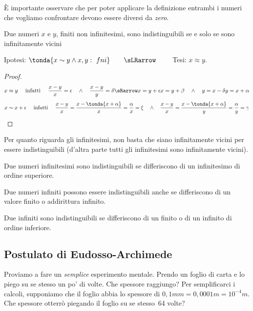 \begin{osservazione}
 È importante osservare che per poter applicare la definizione entrambi i 
numeri che vogliamo confrontare devono essere diversi da \emph{zero}.
\end{osservazione}

\begin{teorema}
Due numeri $x$ e $y$, finiti non infinitesimi, sono indistinguibili se e solo 
se 
sono infinitamente vicini
\end{teorema}
\begin{center}
Ipotesi: $\tonda{x \sim y \wedge x,y:\ fni}\qquad \sLRarrow\qquad$ Tesi: 
$x\approx y$.
\end{center}

\begin{proof}
\[x \approx y \quad \text{ infatti } \quad
\frac{x-y}{x} = \epsilon \quad \wedge \quad 
\frac{x-y}{y} = \delta \sRarrow x=y+\epsilon x=y+\beta \quad \wedge \quad 
y=x-\delta y=x+\alpha
\]
\[x \sim x+\epsilon \quad \text{ infatti } \quad
\frac{x-y}{x}=\frac{x-\tonda{x+\alpha}}{x} = \frac{\alpha}{x}= \xi \quad 
\wedge \quad 
\frac{x-y}{x}=\frac{x-\tonda{x+\alpha}}{y} = \frac{\alpha}{y}= \gamma
\]
\end{proof}

Per quanto riguarda gli infinitesimi, non basta che siano infinitamente 
vicini 
per essere indistinguibili (d'altra parte tutti gli infinitesimi sono 
infinitamente vicini).

\begin{teorema}
Due numeri infinitesimi sono indistinguibili se differiscono di un 
infinitesimo di ordine superiore.
\end{teorema}

Due numeri infiniti possono essere indistinguibili anche se differiscono di 
un 
valore finito o addirittura infinito. 

\begin{teorema}
Due infiniti sono indistinguibili se 
differiscono di un finito o di un infinito di ordine inferiore.
\end{teorema}


\subsection{Postulato di Eudosso-Archimede}
\label{subsec:insnum_eudossoarchimede}

Proviamo a fare un \emph{semplice} esperimento mentale. Prendo un foglio di 
carta e lo piego su se stesso un po' di volte. Che spessore raggiungo?
Per semplificarci i calcoli, supponiamo che il foglio abbia lo spessore 
di $0,1mm = 0,0001m = 10^{-4}m$. 
Che spessore otterrò piegando il foglio su se stesso~64 volte?

